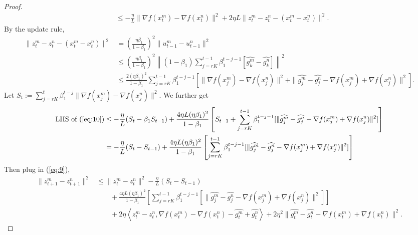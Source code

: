 \documentclass{article} %
\numberwithin{equation}{section}
\renewcommand{\eqref}[1]{(\ref{#1})}
\begin{document}
\begin{proof}
\begin{equation}
\begin{aligned}
            &\leq -\frac{\eta}{L}\|\nabla f(x_t^m)-\nabla f(x_t^n)\|^2 + 2\eta L \|z_t^m-z_t^n-(x_t^m-x_t^n)\|^2.
        \end{aligned}
    \end{equation}
    By the update rule,
    \begin{equation}
        \begin{aligned}
            \|z_t^m-z_t^n-(x_t^m-x_t^n)\|^2
            &= \left(\frac{\eta\beta_1}{1-\beta_1}\right)^2\|u_{t-1}^m-u_{t-1}^n\|^2 \\
            &\leq \left(\frac{\eta\beta_1}{1-\beta_1}\right)^2\left\|(1-\beta_1)\sum_{j=rK}^{t-1}\beta_1^{t-j-1}[\widehat{g_k^m}-\widehat{g_k^n}]\right\|^2 \\
            &\leq \frac{2(\eta\beta_1)^2}{1-\beta_1}\sum_{j=rK}^{t-1}\beta_1^{t-j-1}\left[\|\nabla f(x_j^m)-\nabla f(x_j^n)\|^2+\|\widehat{g_j^m}-\widehat{g_j^n}-\nabla f(x_j^m)+\nabla f(x_j^n)\|^2\right].
        \end{aligned}
    \end{equation}
    Let $S_t:= \sum_{j=rK}^t\beta_1^{t-j}\|\nabla f(x_j^m)-\nabla f(x_j^n)\|^2$. We further get
    \begin{equation}
        \begin{aligned}
            \text{LHS of \eqref{eq:10}}
            &\leq -\frac{\eta}{L}(S_t-\beta_1S_{t-1})+ \frac{4\eta L(\eta\beta_1)^2}{1-\beta_1}\left[S_{t-1}+\sum_{j=rK}^{t-1}\beta_1^{t-j-1}[\|\widehat{g_j^m}-\widehat{g_j^n}-\nabla f(x_j^m)+\nabla f(x_j^n)\|^2]\right] \\
            &= -\frac{\eta}{L}(S_t-S_{t-1})+\frac{4\eta L(\eta\beta_1)^2}{1-\beta_1}\left[\sum_{j=rK}^{t-1}\beta_1^{t-j-1}[\|\widehat{g_j^m}-\widehat{g_j^n}-\nabla f(x_j^m)+\nabla f(x_j^n)\|^2]\right]
        \end{aligned}
    \end{equation}
    Then plug in \eqref{eq:9}, 
    \begin{equation}
        \begin{aligned}
            \|z_{t+1}^m-z_{t+1}^n\|^2
            &\leq \|z_t^m-z_t^n\|^2-\frac{\eta}{L}(S_t-S_{t-1}) \\
            &\qquad + \frac{4\eta L(\eta\beta_1)^2}{1-\beta_1}\left[\sum_{j=rK}^{t-1}\beta_1^{t-j-1}[\|\widehat{g_j^m}-\widehat{g_j^n}-\nabla f(x_j^m)+\nabla f(x_j^n)\|^2]\right] \\
            &\qquad + 2\eta\left\langle z_t^m-z_t^n,\nabla f(x_t^m)-\nabla f(x_t^n)-\widehat{g_t^m} + \widehat{g_t^n}\right\rangle + 2\eta^2\|\widehat{g_t^m}-\widehat{g_t^n}-\nabla f(x_t^m)+\nabla f(x_t^n)\|^2.

\end{aligned}
\end{equation}
\end{proof}
\end{document}
